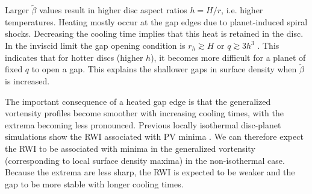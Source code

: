 Larger $\tilde\beta$ values result in higher disc aspect ratios $h=H/r$,
i.e. higher temperatures. Heating mostly occur at the gap edges
due to planet-induced spiral shocks. Decreasing the cooling time
implies that this heat is retained in the disc. In the inviscid limit the gap
opening condition is $r_h\gtrsim H$ or $q\gtrsim 3h^3$
\citep{crida06}. 
This indicates that for hotter discs (higher
$h$), it becomes more difficult for a planet of fixed $q$ to open a
gap. This explains the shallower gaps in surface density when
$\tilde{\beta}$ is increased. 


The important consequence of a heated gap edge is that the
generalized vortensity profiles become smoother with increasing
cooling times, with the extrema becoming less pronounced. Previous locally
isothermal disc-planet simulations show the RWI associated with PV
minima \citep{li05,lin10}. We can therefore expect the RWI to be associated with
minima in the generalized vortensity (corresponding to local surface
density maxima) in the non-isothermal case. Because the extrema are
less sharp, the RWI is expected to be weaker and the gap to be more
stable with longer cooling times.  


